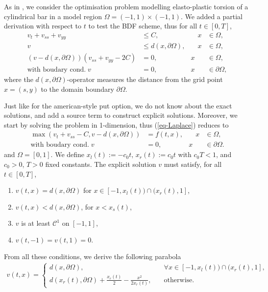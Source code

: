 \documentclass[12pt,a4paper]{article}
\begin{document}
As in \cite{Oosterlee}, we consider the optimisation problem modelling elasto-plastic torsion of a cylindrical bar in a model region $\Omega = (-1,1) \times (-1,1)$. We added a partial derivation with respect to $t$ to test the BDF scheme, thus for all $t \in [0,T]$,
\begin{equation}
\label{eq-Laplace}
\begin{aligned}
	v_t + v_{ss} + v_{yy} &\leq C, & \quad x &\in \Omega, \\
	v &\leq d(x, \partial \Omega), & \quad x &\in \Omega, \\
	(v-d(x,\partial \Omega))(v_{ss} + v_{yy} - 2C) &= 0, \quad & x &\in \Omega, \\
	\text{with boudary cond.} \; v &= 0, \quad & x &\in \partial \Omega,
\end{aligned}
\end{equation}
where the $d(x, \partial \Omega)$-operator measures the distance from the grid point $x = (s,y)$ to the domain boundary $\partial \Omega$.

Just like for the american-style put option, we do not know about the exact solutions, and add a source term to construct explicit solutions. Moreover, we start by solving the problem in 1-dimension, thus (\ref{eq-Laplace}) reduces to
\begin{equation}
\label{eq-Laplace_1d}
\begin{aligned}
	\max(v_t + v_{ss} - C, v - d(x, \partial \Omega)) &= f(t,x), & \quad x &\in \Omega, \\
	\text{with boudary cond.} \; v &= 0, \quad & x &\in \partial \Omega.
\end{aligned}
\end{equation}
and $\Omega = [0,1]$.
We define $x_l(t) := -c_0 t$, $x_r(t) := c_0 t$ with $c_0 T < 1$, and $c_0>0$, $T>0$ fixed constants. The explicit solution $v$ must satisfy, for all $t \in [0,T]$,
\begin{small}
\begin{enumerate}
	\item $v(t,x) = d(x, \partial \Omega)$ for $x \in [-1, x_l(t)) \cap (x_r(t), 1]$,
	\item $v(t,x) < d(x, \partial \Omega)$, for $x < x_s(t)$,
	\item $v$ is at least $\mathcal{C}^1$ on $[-1, 1]$,
	\item $v(t,-1) = v(t,1) = 0$.
\end{enumerate}
\end{small}

From all these conditions, we derive the following parabola
\begin{align}
	v(t,x) = \left\lbrace \begin{array}{ll}
	d(x, \partial \Omega), \quad & \forall x \in [-1, x_l(t)) \cap (x_r(t), 1], \\
	d(x_r(t), \partial \Omega) + \frac{x_r(t)}{2} - \frac{x^2}{2 x_r(t)}, \quad & \text{otherwise}.	
	\end{array} \right. \label{eq-explicit_sol_ameroption2}
\end{align}
\end{document}

